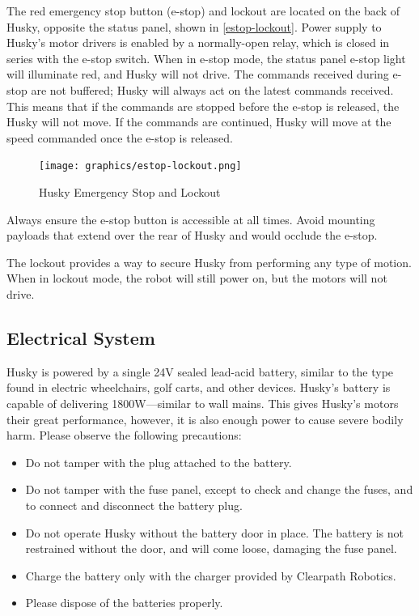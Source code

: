 \documentclass[]{clearpath-latex/clearpath-manual}
\begin{document}
The red emergency stop button (e-stop) and lockout are located on the back of Husky, opposite the status panel,
shown in \autoref{estop-lockout}. Power supply to Husky’s motor drivers is enabled by a normally-open relay,
which is closed in series with the e-stop switch. When in e-stop mode, the status panel e-stop light will illuminate red,
and Husky will not drive. The commands received during e-stop are not buffered; Husky will always act on the latest commands
received. This means that if the commands are stopped before the e-stop is released, the Husky will not move. If the
commands are continued, Husky will move at the speed commanded once the e-stop is released.

\begin{figure}[h]
	\centering
	\texttt{[image: graphics/estop-lockout.png]}
	\caption{Husky Emergency Stop and Lockout}
	\label{estop-lockout}
\end{figure}

Always ensure the e-stop button is accessible at all times. Avoid mounting payloads that extend over the rear of Husky and would occlude the e-stop.

The lockout provides a way to secure Husky from performing any type of motion. When in lockout mode, the robot will still power on, but the motors will not drive.

\subsection{Electrical System}
Husky is powered by a single 24V sealed lead-acid battery, similar to the type found in electric wheelchairs, golf carts,
and other devices. Husky’s battery is capable of delivering 1800W—similar to wall mains. This gives Husky’s motors their
great performance, however, it is also enough power to cause severe bodily harm. Please observe the following precautions:

\begin{itemize}
	\item Do not tamper with the plug attached to the battery.
	\item Do not tamper with the fuse panel, except to check and change the fuses, and to connect and disconnect the battery plug.
	\item Do not operate Husky without the battery door in place. The battery is not restrained without the door, and will come loose, damaging the fuse panel.
	\item Charge the battery only with the charger provided by Clearpath Robotics.
	\item Please dispose of the batteries properly.
\end{itemize}
\end{document}
